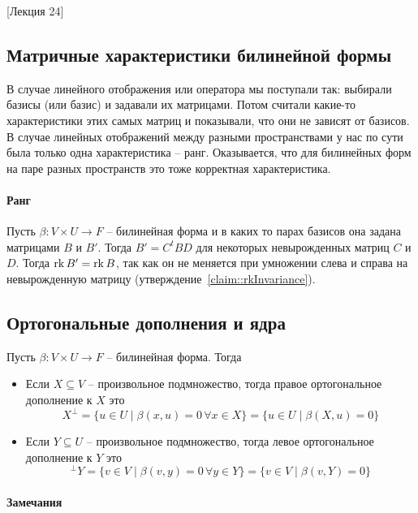 [Лекция 24]


\subsection{Матричные характеристики билинейной формы}
\label{subsection::BilChar}

В случае линейного отображения или оператора мы поступали так: выбирали базисы (или базис) и задавали их матрицами.
Потом считали какие-то характеристики этих самых матриц и показывали, что они не зависят от базисов.
В случае линейных отображений между разными пространствами у нас по сути была только одна характеристика -- ранг.
Оказывается, что для билинейных форм на паре разных пространств это тоже корректная характеристика.

\paragraph{Ранг}

Пусть $\beta\colon V\times U\to F$ -- билинейная форма и в каких то парах базисов она задана матрицами $B$ и $B'$.
Тогда $B' = C^t B D$ для некоторых невырожденных матриц $C$ и $D$.
Тогда $\operatorname{rk} B' = \operatorname{rk} B$, так как он не меняется при умножении слева и справа на невырожденную матрицу (утверждение~\ref{claim::rkInvariance}).

\subsection{Ортогональные дополнения и ядра}

\begin{definition}
Пусть $\beta\colon V\times U\to F$ -- билинейная форма.
Тогда
\begin{itemize}
\item Если $X\subseteq V$ -- произвольное подмножество, тогда правое ортогональное дополнение к $X$ это
\[
X^\bot = \{u\in U \mid \beta(x,u) = 0\,\forall x\in X\} = \{u\in U\mid \beta(X,u) = 0\}
\]

\item Если $Y\subseteq U$ -- произвольное подмножество, тогда левое ортогональное дополнение к $Y$ это
\[
{}^\bot Y = \{v\in V\mid \beta(v, y) = 0\,\forall y\in Y\} = \{v\in V\mid \beta(v, Y) = 0\}
\]
\end{itemize}
\end{definition}

\paragraph{Замечания}

